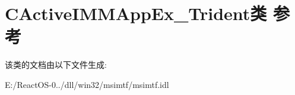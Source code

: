 \hypertarget{class_c_active_i_m_m_app_ex___trident}{}\section{C\+Active\+I\+M\+M\+App\+Ex\+\_\+\+Trident类 参考}
\label{class_c_active_i_m_m_app_ex___trident}


该类的文档由以下文件生成\+:\begin{DoxyCompactItemize}
\item 
E\+:/\+React\+O\+S-\/0../dll/win32/msimtf/msimtf.\+idl\end{DoxyCompactItemize}
